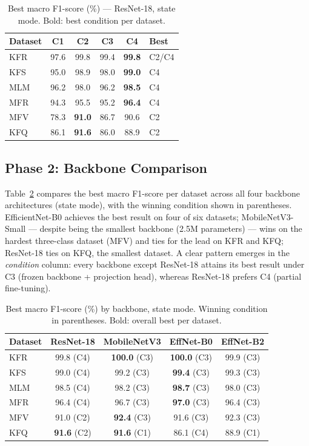 \documentclass[conference]{IEEEtran}
\begin{document}
\begin{table}[h]
\centering
\caption{Best macro F1-score (\%) --- ResNet-18, state mode.
Bold: best condition per dataset.}
\label{tab:r18}
\setlength{\tabcolsep}{5pt}
\begin{tabular}{lccccl}
\toprule
\textbf{Dataset} & \textbf{C1} & \textbf{C2} & \textbf{C3} & \textbf{C4} & \textbf{Best} \\
\midrule
KFR & 97.6 & 99.8 & 99.4 & \textbf{99.8} & C2/C4 \\
KFS & 95.0 & 98.9 & 98.0 & \textbf{99.0} & C4 \\
MLM & 96.2 & 98.0 & 96.2 & \textbf{98.5} & C4 \\
MFR & 94.3 & 95.5 & 95.2 & \textbf{96.4} & C4 \\
MFV & 78.3 & \textbf{91.0} & 86.7 & 90.6 & C2 \\
KFQ & 86.1 & \textbf{91.6} & 86.0 & 88.9 & C2 \\
\bottomrule
\end{tabular}
\end{table}

\subsection{Phase 2: Backbone Comparison}

Table~\ref{tab:backbone} compares the best macro F1-score per dataset
across all four backbone architectures (state mode), with the winning
condition shown in parentheses.
EfficientNet-B0 achieves the best result on four of six datasets;
MobileNetV3-Small --- despite being the smallest backbone (2.5M
parameters) --- wins on the hardest three-class dataset (MFV) and ties for
the lead on KFR and KFQ; ResNet-18 ties on KFQ, the smallest dataset.
A clear pattern emerges in the \emph{condition} column: every backbone
except ResNet-18 attains its best result under C3 (frozen backbone +
projection head), whereas ResNet-18 prefers C4 (partial fine-tuning).

\begin{table}[h]
\centering
\caption{Best macro F1-score (\%) by backbone, state mode.
Winning condition in parentheses. Bold: overall best per dataset.}
\label{tab:backbone}
\setlength{\tabcolsep}{3pt}
\begin{tabular}{lcccc}
\toprule
\textbf{Dataset} & \textbf{ResNet-18} & \textbf{MobileNetV3}
    & \textbf{EffNet-B0} & \textbf{EffNet-B2} \\
\midrule
KFR & 99.8 (C4) & \textbf{100.0} (C3) & \textbf{100.0} (C3) & 99.9 (C3) \\
KFS & 99.0 (C4) & 99.2 (C3) & \textbf{99.4} (C3) & 99.3 (C3) \\
MLM & 98.5 (C4) & 98.2 (C3) & \textbf{98.7} (C3) & 98.0 (C3) \\
MFR & 96.4 (C4) & 96.7 (C3) & \textbf{97.0} (C3) & 96.4 (C3) \\
MFV & 91.0 (C2) & \textbf{92.4} (C3) & 91.6 (C3) & 92.3 (C3) \\
KFQ & \textbf{91.6} (C2) & \textbf{91.6} (C1) & 86.1 (C4) & 88.9 (C1) \\
\bottomrule
\end{tabular}
\end{table}
\end{document}
